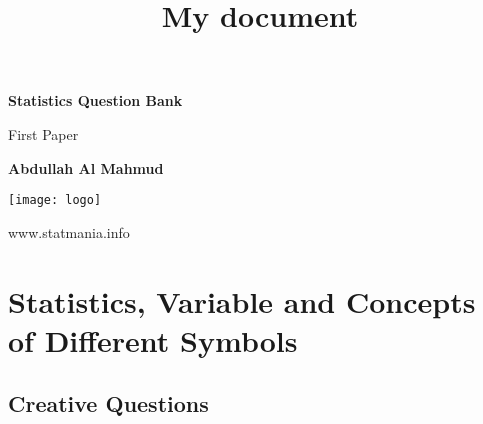 \documentclass[a4paper,oneside]{book}
\title{My document}
\begin{document}
\frontmatter

\begin{titlepage}
    \begin{center}
        \vspace*{1cm}
            
        \Huge
        \textbf{Statistics Question Bank}
            
        \vspace{0.5cm}
        \LARGE
        First Paper
            
        \vspace{1.5cm}
            
        \textbf{Abdullah Al Mahmud}
            
        \vfill
            
            
        \vspace{0.8cm}
            
 \texttt{[image: logo]}
 
        \Large
        www.statmania.info\\
            
    \end{center}
\end{titlepage}

\tableofcontents


\mainmatter

\chapter{Statistics, Variable and Concepts of Different Symbols} 

\section{Creative Questions}
\end{document}
